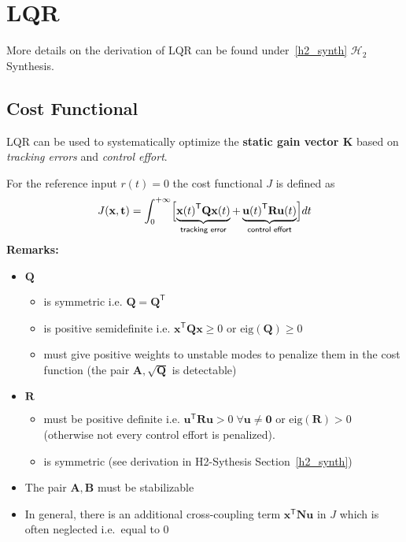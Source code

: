 \section{LQR}
More details on the derivation of LQR can be found under~\ref{h2_synth} $\mathcal{H}_2$ Synthesis.
\subsection{Cost Functional}
LQR can be used to systematically optimize the \textbf{static gain vector K} based on \textit{tracking errors} and \textit{control effort}.

For the reference input $r(t) = 0$ the cost functional $J$ is defined as
\noindent\begin{equation*}
    J(\mathbf{x,t})=\int_0^{+\infty} \Bigl[\underbrace{{\mathbf{x}(t)}^{\mathsf{T}}\mathbf{Qx}(t)}_{\textsf{tracking error}} + \underbrace{{\mathbf{u}(t)}^{\mathsf{T}} \mathbf{Ru}(t)}_{\textsf{control effort}} \Bigr]dt
\end{equation*}
\textbf{Remarks:}
\begin{itemize}
    \item $\mathbf{Q}$
          \begin{itemize}
              \item is symmetric i.e. $\mathbf{Q}=\mathbf{Q}^{\mathsf{T}}$
              \item is positive semidefinite i.e. $\mathbf{x}^{\mathsf{T}} \mathbf{Qx} \geq 0$ or $\mathrm{eig}(\mathbf{Q}) \geq 0$
              \item must give positive weights to unstable modes to penalize them in the cost function (the pair $\mathbf{A}, \sqrt{\mathbf{Q}}$ is detectable)
          \end{itemize}
    \item $\mathbf{R}$ 
    \begin{itemize}
        \item must be positive definite i.e. $\mathbf{u}^{\mathsf{T}} \mathbf{Ru} >0\; \forall \mathbf{u}\neq \mathbf{0}$ or $\mathrm{eig}(\mathbf{R}) > 0$ (otherwise not every control effort is penalized).
        \item is symmetric (see derivation in H2-Sythesis Section~\ref{h2_synth})
    \end{itemize}
    \item The pair $\mathbf{A,B}$ must be stabilizable
    \item In general, there is an additional cross-coupling term $\mathbf{x}^{\mathsf{T}}\mathbf{Nu}$ in $J$ which is often neglected i.e.\ equal to $0$
\end{itemize}

